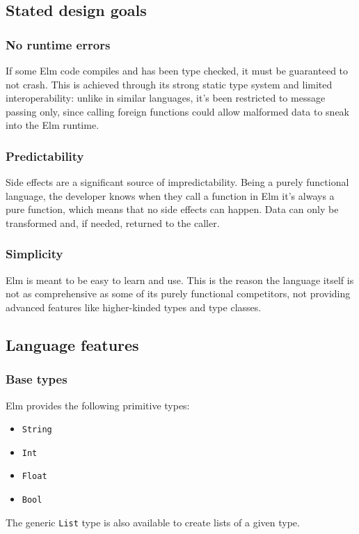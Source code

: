 \subsection{Stated design goals}

\subsubsection{No runtime errors}
If some Elm code compiles and has been type checked, it must be guaranteed to not crash. This is achieved through its strong static type system and limited interoperability: unlike in similar languages, it's been restricted to message passing only, since calling foreign functions could allow malformed data to sneak into the Elm runtime.

\subsubsection{Predictability}
Side effects are a significant source of impredictability. Being a purely functional language, the developer knows when they call a function in Elm it's always a pure function, which means that no side effects can happen. Data can only be transformed and, if needed, returned to the caller.

\subsubsection{Simplicity}
Elm is meant to be easy to learn and use. This is the reason the language itself is not as comprehensive as some of its purely functional competitors, not providing advanced features like higher-kinded types and type classes.

\subsection{Language features}
\subsubsection{Base types}
Elm provides the following primitive types:
\begin{itemize}
    \item \texttt{String}
    \item \texttt{Int}
    \item \texttt{Float}
    \item \texttt{Bool}
\end{itemize}
The generic \texttt{List} type is also available to create lists of a given type.\\


